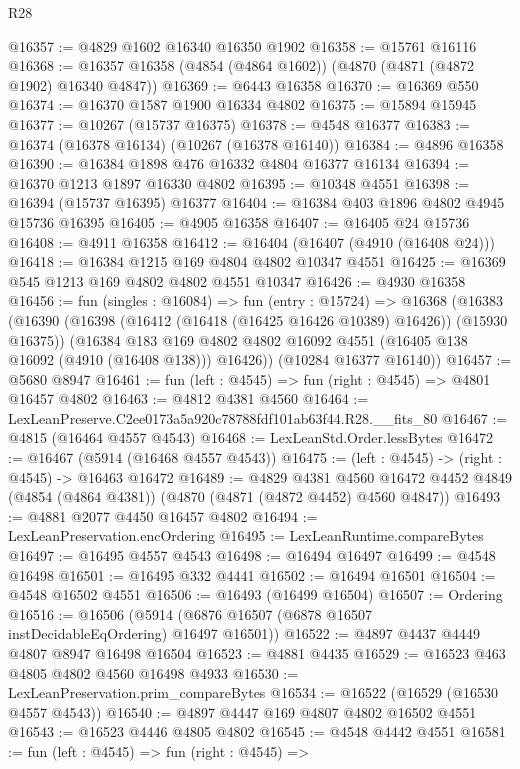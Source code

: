 \begin{lexlean}{R28}
\begin{coremodule}
@16357 := @4829 @1602 @16340 @16350 @1902
@16358 := @15761 @16116
@16368 := @16357 @16358 (@4854 (@4864 @1602)) (@4870 (@4871 (@4872 @1902) @16340 @4847))
@16369 := @6443 @16358
@16370 := @16369 @550
@16374 := @16370 @1587 @1900 @16334 @4802
@16375 := @15894 @15945
@16377 := @10267 (@15737 @16375)
@16378 := @4548 @16377
@16383 := @16374 (@16378 @16134) (@10267 (@16378 @16140))
@16384 := @4896 @16358
@16390 := @16384 @1898 @476 @16332 @4804 @16377 @16134
@16394 := @16370 @1213 @1897 @16330 @4802
@16395 := @10348 @4551
@16398 := @16394 (@15737 @16395) @16377
@16404 := @16384 @403 @1896 @4802 @4945 @15736 @16395
@16405 := @4905 @16358
@16407 := @16405 @24 @15736
@16408 := @4911 @16358
@16412 := @16404 (@16407 (@4910 (@16408 @24)))
@16418 := @16384 @1215 @169 @4804 @4802 @10347 @4551
@16425 := @16369 @545 @1213 @169 @4802 @4802 @4551 @10347
@16426 := @4930 @16358
@16456 := fun (singles : @16084) =>
  fun (entry : @15724) =>
  @16368
    (@16383
      (@16390
        (@16398 (@16412 (@16418 (@16425 @16426 @10389) @16426)) (@15930 @16375))
        (@16384
          @183
          @169
          @4802
          @4802
          @16092
          @4551
          (@16405 @138 @16092 (@4910 (@16408 @138)))
          @16426))
      (@10284 @16377 @16140))
@16457 := @5680 @8947
@16461 := fun (left : @4545) => fun (right : @4545) => @4801 @16457 @4802
@16463 := @4812 @4381 @4560
@16464 := LexLeanPreserve.C2ee0173a5a920c78788fdf101ab63f44.R28.__fits_80
@16467 := @4815 (@16464 @4557 @4543)
@16468 := LexLeanStd.Order.lessBytes
@16472 := @16467 (@5914 (@16468 @4557 @4543))
@16475 := (left : @4545) -> (right : @4545) -> @16463 @16472
@16489 := @4829
    @4381
    @4560
    @16472
    @4452
    @4849
    (@4854 (@4864 @4381))
    (@4870 (@4871 (@4872 @4452) @4560 @4847))
@16493 := @4881 @2077 @4450 @16457 @4802
@16494 := LexLeanPreservation.encOrdering
@16495 := LexLeanRuntime.compareBytes
@16497 := @16495 @4557 @4543
@16498 := @16494 @16497
@16499 := @4548 @16498
@16501 := @16495 @332 @4441
@16502 := @16494 @16501
@16504 := @4548 @16502 @4551
@16506 := @16493 (@16499 @16504)
@16507 := Ordering
@16516 := @16506 (@5914 (@6876 @16507 (@6878 @16507 instDecidableEqOrdering) @16497 @16501))
@16522 := @4897 @4437 @4449 @4807 @8947 @16498 @16504
@16523 := @4881 @4435
@16529 := @16523 @463 @4805 @4802 @4560 @16498 @4933
@16530 := LexLeanPreservation.prim_compareBytes
@16534 := @16522 (@16529 (@16530 @4557 @4543))
@16540 := @4897 @4447 @169 @4807 @4802 @16502 @4551
@16543 := @16523 @4446 @4805 @4802
@16545 := @4548 @4442 @4551
@16581 := fun (left : @4545) =>
  fun (right : @4545) =>

\end{coremodule}
\end{lexlean}
